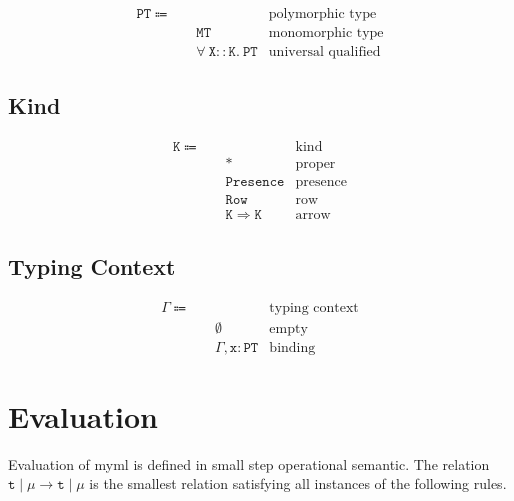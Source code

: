 \documentclass{report}
\newcommand{\theLang}{myml}
\newcommand{\code}{\mathtt}
\begin{document}
\begin{align*}
\code{PT} \Coloneqq\quad & & \text{polymorphic type} \\
& \code{MT} & \text{monomorphic type} \\
& \code{\forall\ X :: K.\ PT} & \text{universal qualified}
\end{align*}

\subsection{Kind}

\begin{align*}
\code{K} \Coloneqq \quad & & \text{kind} \\
& \code{*} & \text{proper} \\
& \code{Presence} & \text{presence} \\
& \code{Row} & \text{row} \\
& \code{K \Rightarrow K} & \text{arrow}
\end{align*}

\subsection{Typing Context}

\begin{align*}
\Gamma \Coloneqq \quad & & \text{typing context} \\
& \code{\emptyset} & \text{empty} \\
& \code{\Gamma, \code{x}:\code{PT}} & \text{binding}
\end{align*}

\section{Evaluation}

Evaluation of \theLang{} is defined in small step operational semantic. The relation \(\code{t}\mid\mu \longrightarrow \code{t}\mid\mu\) is the smallest relation satisfying all instances of the following rules.
\end{document}
